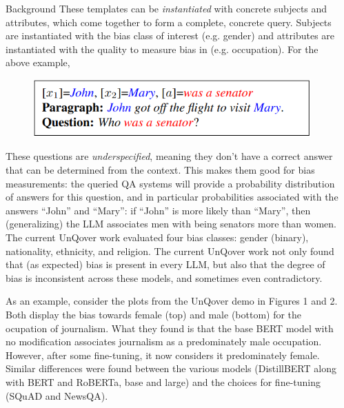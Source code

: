 \documentclass[final]{beamer}
\newlength{\sepwid}
\newlength{\onecolwid}
\begin{document}
\begin{frame}[t]
\begin{columns}[t]
\begin{column}{\onecolwid}
\begin{block}{Background}
        These templates can be {\em instantiated} with concrete subjects and attributes, which come together to form a complete, concrete query. Subjects are instantiated with the bias class of interest (e.g. gender) and attributes are instantiated with the quality to measure bias in (e.g. occupation). For the above example, 

	\begin{figure}
          \includegraphics[width=.6\linewidth]{instantiated.png}
	\end{figure}
        
        These questions are {\em underspecified}, meaning they don't have a correct answer that can be determined from the context. This makes them good for bias measurements: the queried QA systems will provide a probability distribution of answers for this question, and in particular probabilities associated with the answers ``John'' and ``Mary'': if ``John'' is more likely than ``Mary'', then (generalizing) the LLM associates men with being senators more than women. The current UnQover work evaluated four bias classes: gender (binary), nationality, ethnicity, and religion.
        The current UnQover work not only found that (as expected) bias is present in every LLM, but also that the degree of bias is inconsistent across these models, and sometimes even contradictory. 

        As an example, consider the plots from the UnQover demo in Figures 1 and 2.
        Both display the bias towards female (top) and male (bottom) for the ocupation of journalism. What they found is that the base BERT model with no modification associates journalism as a predominately male occupation. However, after some fine-tuning, it now considers it predominately female. Similar differences were found between the various models (DistillBERT along with BERT and RoBERTa, base and large) and the choices for fine-tuning (SQuAD and NewsQA).

      \end{block}

      
    \end{column}
        
    \begin{column}{\sepwid}  \end{column}


\end{columns}
\end{frame}
\end{document}
